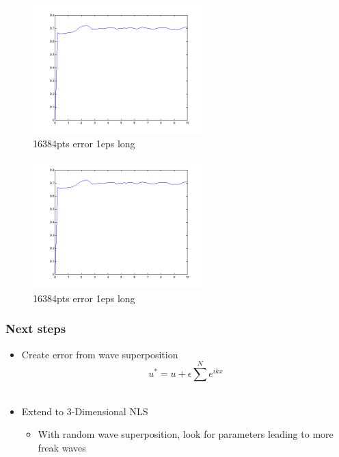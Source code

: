 \documentclass{beamer}
\def\b{\begin}
\def\e{\end}
\theoremstyle{plain}
\theoremstyle{definition}
\begin{document}
\frame
{
\begin{figure}
\begin{center}
\includegraphics[width=250px]{16384pts_error_1eps_long.png}\\
16384pts error 1eps long
\end{center}
\end{figure}
}


\frame
{
\begin{figure}
\begin{center}
\includegraphics[width=250px]{16384pts_error_1eps_long.png}\\
16384pts error 1eps long
\end{center}
\end{figure}
}



\frame
{
\frametitle{Next steps}
\b{itemize}
\item Create error from wave superposition $$u^* = u + \epsilon \sum ^N e^{ik x} $$\\[25pt]

\pause
\item Extend to 3-Dimensional NLS\\[5pt]
\b{itemize}
\item With random wave superposition, look for parameters leading to more freak waves
 
\e{itemize}
\e{itemize}
}
\end{document}
